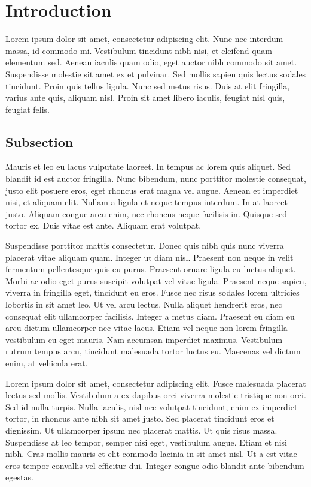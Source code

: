\doublespacing
\section{Introduction}
\sloppy

Lorem ipsum dolor sit amet, consectetur adipiscing elit. Nunc nec interdum massa, id commodo mi. Vestibulum tincidunt nibh nisi, et eleifend quam elementum sed. Aenean iaculis quam odio, eget auctor nibh commodo sit amet. Suspendisse molestie sit amet ex et pulvinar. Sed mollis sapien quis lectus sodales tincidunt. Proin quis tellus ligula. Nunc sed metus risus. Duis at elit fringilla, varius ante quis, aliquam nisl. Proin sit amet libero iaculis, feugiat nisl quis, feugiat felis.
\subsection{Subsection}
Mauris et leo eu lacus vulputate laoreet. In tempus ac lorem quis aliquet. Sed blandit id est auctor fringilla. Nunc bibendum, nunc porttitor molestie consequat, justo elit posuere eros, eget rhoncus erat magna vel augue. Aenean et imperdiet nisi, et aliquam elit. Nullam a ligula et neque tempus interdum. In at laoreet justo. Aliquam congue arcu enim, nec rhoncus neque facilisis in. Quisque sed tortor ex. Duis vitae est ante. Aliquam erat volutpat.

Suspendisse porttitor mattis consectetur. Donec quis nibh quis nunc viverra placerat vitae aliquam quam. Integer ut diam nisl. Praesent non neque in velit fermentum pellentesque quis eu purus. Praesent ornare ligula eu luctus aliquet. Morbi ac odio eget purus suscipit volutpat vel vitae ligula. Praesent neque sapien, viverra in fringilla eget, tincidunt eu eros. Fusce nec risus sodales lorem ultricies lobortis in sit amet leo. Ut vel arcu lectus. Nulla aliquet hendrerit eros, nec consequat elit ullamcorper facilisis. Integer a metus diam. Praesent eu diam eu arcu dictum ullamcorper nec vitae lacus. Etiam vel neque non lorem fringilla vestibulum eu eget mauris. Nam accumsan imperdiet maximus. Vestibulum rutrum tempus arcu, tincidunt malesuada tortor luctus eu. Maecenas vel dictum enim, at vehicula erat.

Lorem ipsum dolor sit amet, consectetur adipiscing elit. Fusce malesuada placerat lectus sed mollis. Vestibulum a ex dapibus orci viverra molestie tristique non orci. Sed id nulla turpis. Nulla iaculis, nisl nec volutpat tincidunt, enim ex imperdiet tortor, in rhoncus ante nibh sit amet justo. Sed placerat tincidunt eros et dignissim. Ut ullamcorper ipsum nec placerat mattis. Ut quis risus massa. Suspendisse at leo tempor, semper nisi eget, vestibulum augue. Etiam et nisi nibh. Cras mollis mauris et elit commodo lacinia in sit amet nisl. Ut a est vitae eros tempor convallis vel efficitur dui. Integer congue odio blandit ante bibendum egestas.

